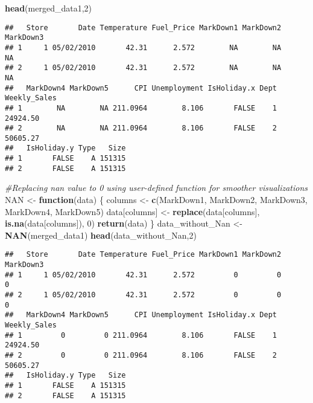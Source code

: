 \documentclass[
]{article}
\newenvironment{Shaded}{\begin{snugshade}}{\end{snugshade}}
\newcommand{\CommentTok}[1]{\textcolor[rgb]{0.56,0.35,0.01}{\textit{#1}}}
\newcommand{\ControlFlowTok}[1]{\textcolor[rgb]{0.13,0.29,0.53}{\textbf{#1}}}
\newcommand{\DecValTok}[1]{\textcolor[rgb]{0.00,0.00,0.81}{#1}}
\newcommand{\FunctionTok}[1]{\textcolor[rgb]{0.13,0.29,0.53}{\textbf{#1}}}
\newcommand{\NormalTok}[1]{#1}
\newcommand{\OtherTok}[1]{\textcolor[rgb]{0.56,0.35,0.01}{#1}}
\newcommand{\StringTok}[1]{\textcolor[rgb]{0.31,0.60,0.02}{#1}}
\begin{document}
\begin{Shaded}
\begin{Highlighting}[]
\FunctionTok{head}\NormalTok{(merged\_data1,}\DecValTok{2}\NormalTok{)}
\end{Highlighting}
\end{Shaded}

\begin{verbatim}
##   Store       Date Temperature Fuel_Price MarkDown1 MarkDown2 MarkDown3
## 1     1 05/02/2010       42.31      2.572        NA        NA        NA
## 2     1 05/02/2010       42.31      2.572        NA        NA        NA
##   MarkDown4 MarkDown5      CPI Unemployment IsHoliday.x Dept Weekly_Sales
## 1        NA        NA 211.0964        8.106       FALSE    1     24924.50
## 2        NA        NA 211.0964        8.106       FALSE    2     50605.27
##   IsHoliday.y Type   Size
## 1       FALSE    A 151315
## 2       FALSE    A 151315
\end{verbatim}

\begin{Shaded}
\begin{Highlighting}[]
\CommentTok{\#Replacing nan value to 0 using user{-}defined function for smoother visualizations}
\NormalTok{NAN }\OtherTok{\textless{}{-}} \ControlFlowTok{function}\NormalTok{(data) \{}
\NormalTok{  columns }\OtherTok{\textless{}{-}} \FunctionTok{c}\NormalTok{(}\StringTok{\textquotesingle{}MarkDown1\textquotesingle{}}\NormalTok{, }\StringTok{\textquotesingle{}MarkDown2\textquotesingle{}}\NormalTok{, }\StringTok{\textquotesingle{}MarkDown3\textquotesingle{}}\NormalTok{, }\StringTok{\textquotesingle{}MarkDown4\textquotesingle{}}\NormalTok{, }\StringTok{\textquotesingle{}MarkDown5\textquotesingle{}}\NormalTok{)}
\NormalTok{  data[columns] }\OtherTok{\textless{}{-}} \FunctionTok{replace}\NormalTok{(data[columns], }\FunctionTok{is.na}\NormalTok{(data[columns]), }\DecValTok{0}\NormalTok{)}
  \FunctionTok{return}\NormalTok{(data)}
\NormalTok{\}}
\NormalTok{data\_without\_Nan }\OtherTok{\textless{}{-}}\FunctionTok{NAN}\NormalTok{(merged\_data1)}
\FunctionTok{head}\NormalTok{(data\_without\_Nan,}\DecValTok{2}\NormalTok{)}
\end{Highlighting}
\end{Shaded}

\begin{verbatim}
##   Store       Date Temperature Fuel_Price MarkDown1 MarkDown2 MarkDown3
## 1     1 05/02/2010       42.31      2.572         0         0         0
## 2     1 05/02/2010       42.31      2.572         0         0         0
##   MarkDown4 MarkDown5      CPI Unemployment IsHoliday.x Dept Weekly_Sales
## 1         0         0 211.0964        8.106       FALSE    1     24924.50
## 2         0         0 211.0964        8.106       FALSE    2     50605.27
##   IsHoliday.y Type   Size
## 1       FALSE    A 151315
## 2       FALSE    A 151315
\end{verbatim}
\end{document}
